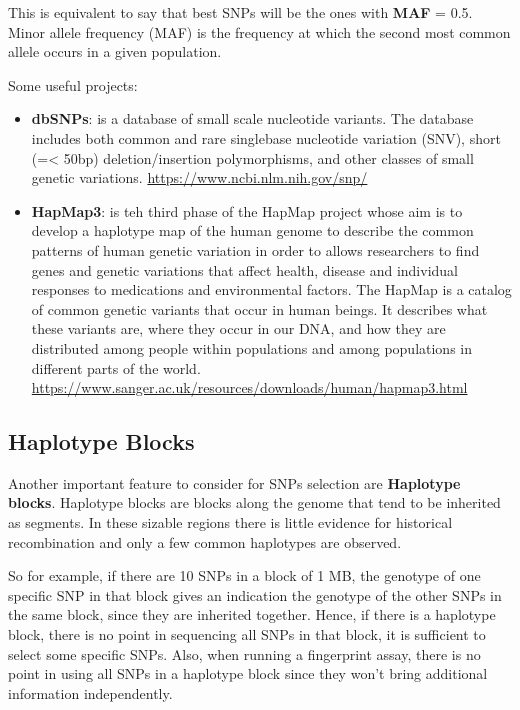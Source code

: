 This is equivalent to say that best SNPs will be the ones with \textbf{MAF} = 0.5. Minor allele frequency (MAF) is the frequency at which the second most common allele occurs in a given population.

\bigskip
Some useful projects:
\begin{itemize}
	\item \textbf{dbSNPs}: is a database of small scale nucleotide variants. The database includes both common and rare singlebase nucleotide variation (SNV), short (=< 50bp) deletion/insertion polymorphisms, and other classes of small genetic variations.
	\url{https://www.ncbi.nlm.nih.gov/snp/}
	
	\item \textbf{HapMap3}: is teh third phase of the HapMap project whose aim is to develop a haplotype map of the human genome to describe the common patterns of human genetic variation in order to allows researchers to find genes and genetic variations that affect health, disease and individual responses to medications and environmental factors. The HapMap is a catalog of common genetic variants that occur in human beings. It describes what these variants are, where they occur in our DNA, and how they are distributed among people within populations and among populations in different parts of the world.
	\url{https://www.sanger.ac.uk/resources/downloads/human/hapmap3.html}
\end{itemize}

\subsection{Haplotype Blocks}

Another important feature to consider for SNPs selection are \textbf{Haplotype blocks}. Haplotype blocks are blocks along the genome that tend to be inherited as segments. In these sizable regions there is little evidence for historical recombination and only a few common haplotypes are observed. 

So for example, if there are 10 SNPs in a block of 1 MB, the genotype of one specific SNP in that block gives an indication the genotype of the other SNPs in the same block, since they are inherited together. 
Hence, if there is a haplotype block, there is no point in sequencing all SNPs in that block, it is sufficient to select some specific SNPs. Also, when running a fingerprint assay, there is no point in using all SNPs in a haplotype block since they won't bring additional information independently.

